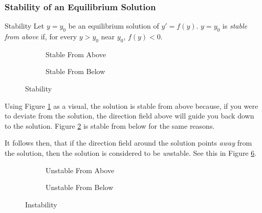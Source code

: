 \documentclass[12pt]{article}
\begin{document}
\subsubsection{Stability of an Equilibrium Solution}
\label{sssec:stabilityOfAnEqulibriumSolution}

\begin{definition}{Stability}
  Let $y=y_0$ be an equilibrium solution of $y' = f(y)$. $y=y_0$ is \textit{stable from above} if, for every $y>y_0$ near $y_0$, $f(y)<0$.
\end{definition}

\begin{figure}[H]
  \centering
  \begin{subfigure}[H]{0.45\textwidth}
    \centering
    
    \caption{Stable From Above}
    \label{fig:002}
  \end{subfigure}
  \begin{subfigure}[H]{0.45\textwidth}
    \centering
    
    \caption{Stable From Below}
    \label{fig:003}
  \end{subfigure}
  \caption{Stability}
  \label{fig:stability}
  \vspace{-10pt}
\end{figure}
Using Figure \ref{fig:002} as a visual, the {\color{gr} solution} is stable from above because, if you were to deviate from the solution, the direction field above will guide you back down to the solution. Figure \ref{fig:003} is stable from below for the same reasons.

It follows then, that if the direction field around the solution points \textit{away} from the solution, then the solution is considered to be \textit{un}stable. See this in Figure \ref{fig:instability}.

\begin{figure}[H]
  \centering
  \begin{subfigure}[H]{0.45\textwidth}
    \centering
    
    \caption{Unstable From Above}
    \label{fig:004}
  \end{subfigure}
  \begin{subfigure}[H]{0.45\textwidth}
    \centering
    
    \caption{Unstable From Below}
    \label{fig:005}
  \end{subfigure}
  \caption{Instability}
  \label{fig:instability}
  \vspace{-10pt}
\end{figure}
\end{document}
